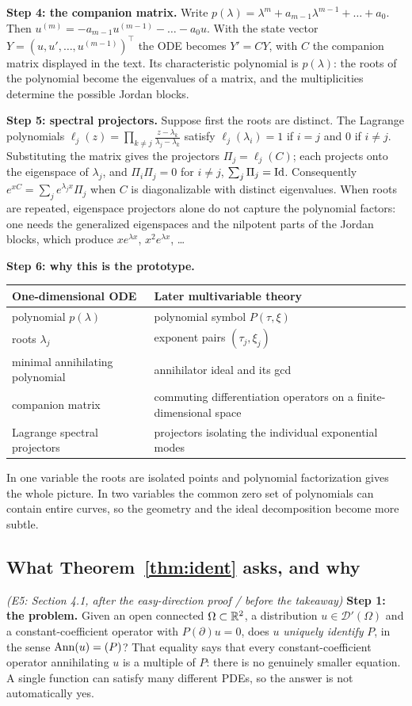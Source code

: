 \medskip\textbf{Step 4: the companion matrix.} Write $p(\lambda)=\lambda^m+a_{m-1}\lambda^{m-1}+\dots+a_0$. Then $u^{(m)}=-a_{m-1}u^{(m-1)}-\dots-a_0u$. With the state vector $Y=(u,u',\dots,u^{(m-1)})^\top$ the ODE becomes $Y'=CY$, with $C$ the companion matrix displayed in the text. Its characteristic polynomial is $p(\lambda)$: the roots of the polynomial become the eigenvalues of a matrix, and the multiplicities determine the possible Jordan blocks.

\medskip\textbf{Step 5: spectral projectors.} Suppose first the roots are distinct. The Lagrange polynomials $\ell_j(z)=\prod_{k\ne j}\frac{z-\lambda_k}{\lambda_j-\lambda_k}$ satisfy $\ell_j(\lambda_i)=1$ if $i=j$ and $0$ if $i\ne j$. Substituting the matrix gives the projectors $\Pi_j=\ell_j(C)$; each projects onto the eigenspace of $\lambda_j$, and $\Pi_i\Pi_j=0$ for $i\ne j$, $\sum_j\Pi_j=\mathrm{Id}$. Consequently $e^{xC}=\sum_je^{\lambda_jx}\Pi_j$ when $C$ is diagonalizable with distinct eigenvalues. When roots are repeated, eigenspace projectors alone do not capture the polynomial factors: one needs the generalized eigenspaces and the nilpotent parts of the Jordan blocks, which produce $xe^{\lambda x}$, $x^2e^{\lambda x}$, \dots

\medskip\textbf{Step 6: why this is the prototype.}
\begin{center}\small
\begin{tabular}{@{}L{5.6cm}L{8.6cm}@{}}
\toprule
One-dimensional ODE & Later multivariable theory\\\midrule
polynomial $p(\lambda)$ & polynomial symbol $P(\tau,\xi)$\\
roots $\lambda_j$ & exponent pairs $(\tau_j,\xi_j)$\\
minimal annihilating polynomial & annihilator ideal and its gcd\\
companion matrix & commuting differentiation operators on a finite-dimensional space\\
Lagrange spectral projectors & projectors isolating the individual exponential modes\\
\bottomrule
\end{tabular}
\end{center}
In one variable the roots are isolated points and polynomial factorization gives the whole picture. In two variables the common zero set of polynomials can contain entire curves, so the geometry and the ideal decomposition become more subtle.

\subsection{What Theorem~\ref{thm:ident} asks, and why}\label{expl:E5}
\noindent\emph{(E5: Section 4.1, after the easy-direction proof / before the takeaway)}
\textbf{Step 1: the problem.} Given an open connected $\Omega\subset\mathbb{R}^2$, a distribution $u\in\mathcal D'(\Omega)$ and a constant-coefficient operator with $P(\partial)u=0$, does $u$ \emph{uniquely identify} $P$, in the sense $\operatorname{Ann}(u)=(P)$? That equality says that every constant-coefficient operator annihilating $u$ is a multiple of $P$: there is no genuinely smaller equation. A single function can satisfy many different PDEs, so the answer is not automatically yes.

